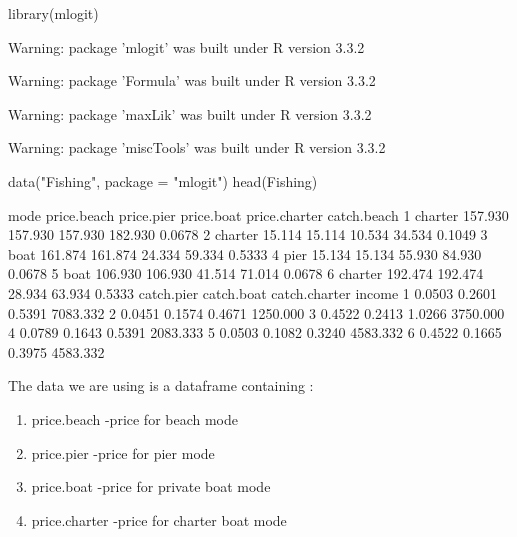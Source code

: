 \documentclass[a4paper,twoside]{tufte-book}\usepackage[]{graphicx}\usepackage[]{color}
\begin{document}
\begin{appendices}
\begin{Schunk}
\begin{Sinput}
library(mlogit)
\end{Sinput}
\begin{Soutput}
Warning: package 'mlogit' was built under R version 3.3.2
\end{Soutput}
\begin{Soutput}
Warning: package 'Formula' was built under R version 3.3.2
\end{Soutput}
\begin{Soutput}
Warning: package 'maxLik' was built under R version 3.3.2
\end{Soutput}
\begin{Soutput}
Warning: package 'miscTools' was built under R version 3.3.2
\end{Soutput}
\begin{Sinput}
data("Fishing", package = "mlogit")
head(Fishing)
\end{Sinput}
\begin{Soutput}
     mode price.beach price.pier price.boat price.charter catch.beach
1 charter     157.930    157.930    157.930       182.930      0.0678
2 charter      15.114     15.114     10.534        34.534      0.1049
3    boat     161.874    161.874     24.334        59.334      0.5333
4    pier      15.134     15.134     55.930        84.930      0.0678
5    boat     106.930    106.930     41.514        71.014      0.0678
6 charter     192.474    192.474     28.934        63.934      0.5333
  catch.pier catch.boat catch.charter   income
1     0.0503     0.2601        0.5391 7083.332
2     0.0451     0.1574        0.4671 1250.000
3     0.4522     0.2413        1.0266 3750.000
4     0.0789     0.1643        0.5391 2083.333
5     0.0503     0.1082        0.3240 4583.332
6     0.4522     0.1665        0.3975 4583.332
\end{Soutput}
\end{Schunk}

The data we are using is a dataframe containing :

\begin{enumerate}
\setlength\itemsep{-0.5em}
\item price.beach -price for beach mode

\item price.pier -price for pier mode

\item price.boat -price for private boat mode

\item price.charter -price for charter boat mode


\end{enumerate}
\end{appendices}
\end{document}
